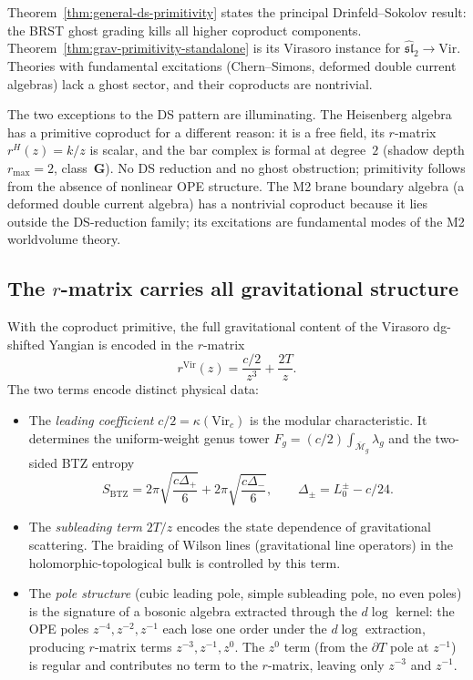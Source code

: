 \documentclass[11pt]{article}
\theoremstyle{plain}
\theoremstyle{definition}
\theoremstyle{remark}
\begin{document}
Theorem~\ref{thm:general-ds-primitivity} states the principal
Drinfeld--Sokolov result: the BRST ghost grading kills all higher
coproduct components. Theorem~\ref{thm:grav-primitivity-standalone}
is its Virasoro instance for
$\widehat{\mathfrak{sl}}_2\to\mathrm{Vir}$.
Theories with fundamental excitations (Chern--Simons, deformed
double current algebras) lack a ghost sector, and their coproducts
are nontrivial.

The two exceptions to the DS pattern are illuminating. The
Heisenberg algebra has a primitive coproduct for a different reason:
it is a free field, its $r$-matrix $r^H(z) = k/z$ is scalar, and
the bar complex is formal at degree~$2$ (shadow depth $r_{\max} = 2$,
class~$\mathbf{G}$). No DS reduction and no ghost obstruction;
primitivity follows from the absence of nonlinear OPE structure.
The M2 brane boundary algebra (a deformed double current algebra)
has a nontrivial coproduct because it lies outside the DS-reduction
family; its excitations are fundamental
modes of the M2 worldvolume theory.


\subsection{The \texorpdfstring{$r$}{r}-matrix carries all
gravitational structure}
\label{subsec:r-matrix-gravity}

With the coproduct primitive, the full gravitational content of
the Virasoro dg-shifted Yangian is encoded in the $r$-matrix
\begin{equation}\label{eq:grav-r-matrix}
r^{\mathrm{Vir}}(z) = \frac{c/2}{z^3} + \frac{2T}{z}.
\end{equation}
The two terms encode distinct physical data:
\begin{itemize}
\item The \emph{leading coefficient} $c/2 = \kappa(\mathrm{Vir}_c)$
 is the modular characteristic. It determines the uniform-weight genus
 tower $F_g = (c/2) \int_{\overline{\mathcal{M}}_g} \lambda_g$ and
 the two-sided BTZ entropy
 \[
 S_{\mathrm{BTZ}}
 =
 2\pi\sqrt{\frac{c\Delta_+}{6}}
 +2\pi\sqrt{\frac{c\Delta_-}{6}},
 \qquad
 \Delta_\pm=L_0^\pm-c/24.
 \]

\item The \emph{subleading term} $2T/z$ encodes the state dependence
 of gravitational scattering. The braiding of Wilson lines
 (gravitational line operators) in the holomorphic-topological
 bulk is controlled by this term.

\item The \emph{pole structure} (cubic leading pole, simple
 subleading pole, no even poles) is the signature of a
 bosonic algebra extracted through the $d\!\log$ kernel: the
 OPE poles $z^{-4}, z^{-2}, z^{-1}$ each lose one order under
 the $d\!\log$ extraction, producing $r$-matrix terms
 $z^{-3}, z^{-1}, z^0$. The $z^0$ term (from the $\partial T$
 pole at $z^{-1}$) is regular and contributes no term to the
 $r$-matrix, leaving only $z^{-3}$ and $z^{-1}$.
\end{itemize}
\end{document}
